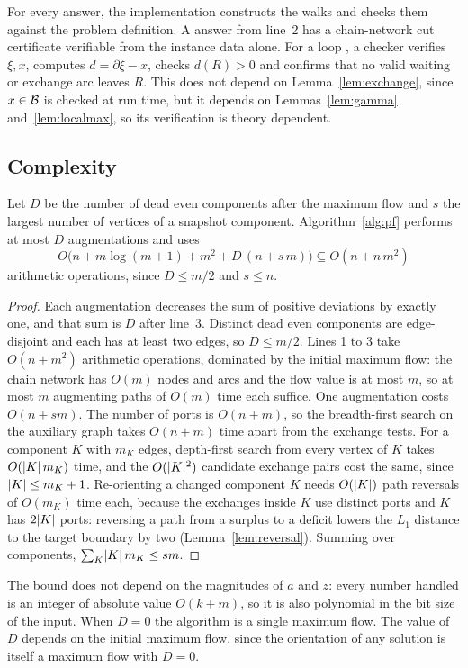 For every \YES{} answer, the implementation constructs the walks and checks them against the problem definition. A \NO{} answer from line~2 has a chain-network cut certificate verifiable from the instance data alone. For a loop \NO{}, a checker verifies $\xi,x$, computes $d=\partial\xi-x$, checks $d(R)>0$ and confirms that no valid waiting or exchange arc leaves $R$. This does not depend on Lemma~\ref{lem:exchange}, since $x\in\mathcal{B}$ is checked at run time, but it depends on Lemmas~\ref{lem:gamma} and~\ref{lem:localmax}, so its verification is theory dependent.

\subsection{Complexity}

\begin{theorem}\label{thm:time}
Let $D$ be the number of dead even components after the maximum flow and $s$ the largest number of vertices of a snapshot component. Algorithm~\ref{alg:pf} performs at most $D$ augmentations and uses
\[
  O\bigl(n+m\log(m+1)+m^2+D\,(n+s\,m)\bigr)\subseteq O(n+n\,m^2)
\]
arithmetic operations, since $D\le m/2$ and $s\le n$.
\end{theorem}

\begin{proof}
Each augmentation decreases the sum of positive deviations by exactly one, and that sum is $D$ after line~3. Distinct dead even components are edge-disjoint and each has at least two edges, so $D\le m/2$. Lines 1 to 3 take $O(n+m^2)$ arithmetic operations, dominated by the initial maximum flow: the chain network has $O(m)$ nodes and arcs and the flow value is at most $m$, so at most $m$ augmenting paths of $O(m)$ time each suffice. One augmentation costs $O(n+sm)$. The number of ports is $O(n+m)$, so the breadth-first search on the auxiliary graph takes $O(n+m)$ time apart from the exchange tests. For a component $K$ with $m_K$ edges, depth-first search from every vertex of $K$ takes $O(\lvert K\rvert\,m_K)$ time, and the $O(\lvert K\rvert^2)$ candidate exchange pairs cost the same, since $\lvert K\rvert\le m_K+1$. Re-orienting a changed component $K$ needs $O(\lvert K\rvert)$ path reversals of $O(m_K)$ time each, because the exchanges inside $K$ use distinct ports and $K$ has $2\lvert K\rvert$ ports: reversing a path from a surplus to a deficit lowers the $L_1$ distance to the target boundary by two (Lemma~\ref{lem:reversal}). Summing over components, $\sum_K\lvert K\rvert\,m_K\le sm$.
\end{proof}

The bound does not depend on the magnitudes of $a$ and $z$: every number handled is an integer of absolute value $O(k+m)$, so it is also polynomial in the bit size of the input. When $D=0$ the algorithm is a single maximum flow. The value of $D$ depends on the initial maximum flow, since the orientation of any solution is itself a maximum flow with $D=0$.
